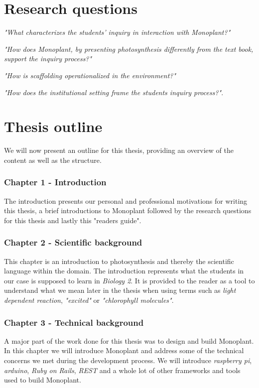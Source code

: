 
\section{Research questions}

\emph{"What characterizes the students’ inquiry in interaction with Monoplant?"}

\emph{"How does Monoplant, by presenting photosynthesis differently from the text book, support the inquiry process?"}

\emph{"How is scaffolding operationalized in the environment?"}

\emph{"How does the institutional setting frame the students inquiry process?"}.

\section{Thesis outline}
We will now present an outline for this thesis, providing an overview of the content as well as the structure. 

\subsubsection*{Chapter 1 - Introduction}
The introduction presents our personal and professional motivations for writing this thesis, a brief introductions to Monoplant followed by the research questions for this thesis and lastly this "readers guide".

\subsubsection*{Chapter 2 - Scientific background}
This chapter is an introduction to photosynthesis and thereby the scientific language within the domain. The introduction represents what the students in our case is supposed to learn in \emph{Biology 2}. It is provided to the reader as a tool to understand what we mean later in the thesis when using terms such as \emph{light dependent reaction}, \emph{"excited"} or \emph{"chlorophyll molecules"}.

\subsubsection*{Chapter 3 - Technical background}
A major part of the work done for this thesis was to design and build Monoplant. In this chapter we will introduce Monoplant and address some of the technical concerns we met during the development process. We will introduce \emph{raspberry pi}, \emph{arduino}, \emph{Ruby on Rails}, \emph{REST} and a whole lot of other frameworks and tools used to build Monoplant.

